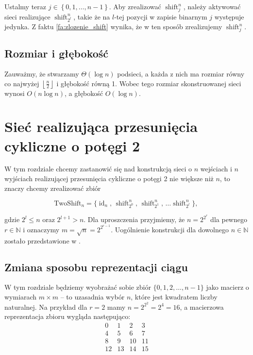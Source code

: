 \documentclass[a4paper]{article}
\newcommand{\shift}[2]{\operatorname{shift}_{#2}^{#1}}
\newcommand{\id}[1]{\operatorname{id}_{#1}}
\newcommand{\tc}{\text{, }}
\newcommand{\floor}[1]{\left\lfloor #1 \right\rfloor}
\newcommand{\twoshift}[1]{\text{TwoShift}_{#1}}
\newcommand{\N}{\mathbb{N}}
\newcommand{\lt}{\left}
\newcommand{\rt}{\right}
\theoremstyle{definition}
\begin{document}
\vspace{.5em}

Ustalmy teraz \(j \in \lt\{ 0, 1, \ldots, n-1 \rt\}\). Aby zrealizować \(\shift n j\), należy aktywować sieci realizujące \(\shift n {2^l}\), takie że na \(l\)-tej pozycji w zapisie binarnym \(j\) występuje jedynka. Z  faktu \ref{fa:zlozenie_shift} wynika, że w ten sposób zrealizujemy \(\shift n j\). 

\subsection{Rozmiar i głębokość}

Zauważmy, że stwarzamy \(\Theta(\log n)\) podsieci, a każda z nich ma rozmiar równy co najwyżej \(\floor{\frac n 2}\) i głębokość równą 1. Wobec tego rozmiar skonstruowanej sieci wynosi \(O(n \log n)\), a głębokość \(O(\log n)\).


\section{Sieć realizująca przesunięcia cykliczne o potęgi 2}

W tym rozdziale chcemy zastanowić się nad konstrukcją sieci o \(n\) wejściach i \(n\) wyjściach realizującej przesunięcia cykliczne o potęgi 2 nie większe niż \(n\), to znaczy chcemy zrealizować zbiór

\[
\twoshift{n} = \{ \id n \tc \shift n {2^0} \tc \shift n {2^1} \tc \ldots \shift n {2^l}\} \tc
\]

gdzie \(2^l \leq n\) oraz \(2^{l+1} > n\). Dla uproszczenia przyjmiemy, że \(n = 2^{2^r}\) dla pewnego \(r \in \N\) i oznaczymy \( m = \sqrt{n} = 2^{2^{r-1}} \). Uogólnienie konstrukcji dla dowolnego \(n \in \N\) zostało przedstawione w \cite{klo}.


\subsection{Zmiana sposobu reprezentacji ciągu}

W tym rozdziale będziemy wyobrażać sobie zbiór \(\{0, 1, 2, \ldots, n-1\}\) jako macierz o wymiarach \(m \times m\) -- to uzasadnia wybór \(n\), które jest kwadratem liczby naturalnej. Na przykład dla \(r = 2\) mamy \(n = 2^{2^2} = 2^4 = 16\), a macierzowa reprezentacja zbioru wygląda następująco:
\[
\begin{matrix}
 0 &  1 &  2 &  3 \\
 4 &  5 &  6 &  7 \\
 8 &  9 & 10 & 11 \\
12 & 13 & 14 & 15
\end{matrix}
\]
\end{document}
